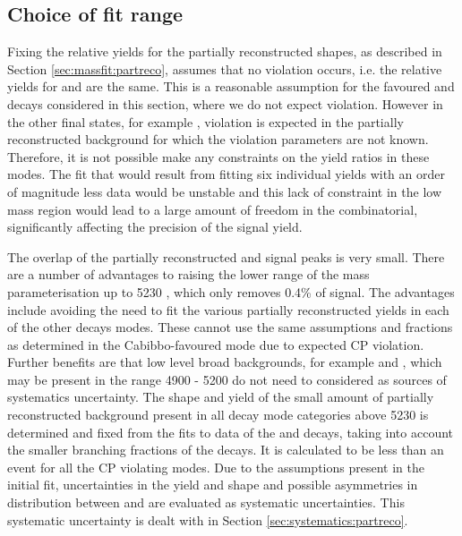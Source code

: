 \subsection{Choice of fit range}
\label{sec:cpfit:range}	

Fixing the relative yields for the partially reconstructed shapes, as described in Section \ref{sec:massfit:partreco}, assumes that no \CP violation occurs, i.e. the relative yields for \Bm and \Bp are the same. This is a reasonable assumption for the favoured \kpi and \kpipipi decays considered in this section, where we do not expect \CP violation. However in the other \Dz final states, for example \pik, \CP violation is expected in the partially reconstructed background for which the \CP violation parameters are not known. Therefore, it is not possible make any constraints on the yield ratios in these modes. The fit that would result from fitting six individual yields with an order of magnitude less data would be unstable and this lack of constraint in the low mass region would lead to a large amount of freedom in the combinatorial, significantly affecting the precision of the signal yield. 

The overlap of the partially reconstructed and signal peaks is very small. There are a number of advantages to raising the lower range of the mass parameterisation up to 5230 \mev, which only removes 0.4\% of signal. The advantages include avoiding the need to fit the various partially reconstructed yields in each of the other \Dz decays modes. These cannot use the same assumptions and fractions as determined in the Cabibbo-favoured mode due to expected CP violation. Further benefits are that low level broad backgrounds, for example \decay{\Bm}{\D\Kstarm\piz} and \decay{\Bd}{\Kp\pim\pip\pim}, which may be present in the range 4900 - 5200 \mev do not need to considered as sources of systematics uncertainty. The shape and yield of the small amount of partially reconstructed background present in all \Dz decay mode categories above 5230 \mev is determined and fixed from the fits to data of the \kpi and \kpipipi decays, taking into account the smaller branching fractions of the \Dz decays. It is calculated to be less than an event for all the CP violating modes. Due to the assumptions present in the initial fit, uncertainties in the yield and shape and possible asymmetries in distribution between \Bp and \Bm are evaluated as systematic uncertainties. This systematic uncertainty is dealt with in Section \ref{sec:systematics:partreco}.


